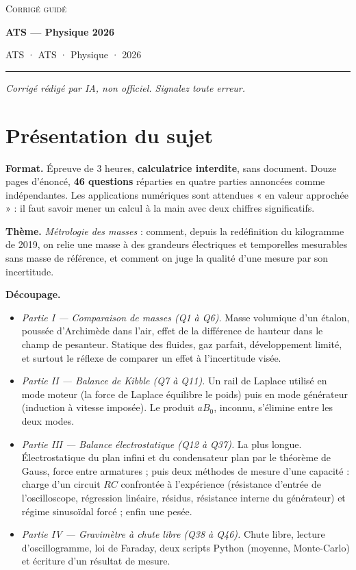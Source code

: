 \documentclass[11pt,a4paper]{article}
\providecommand{\tightlist}{\setlength{\itemsep}{0pt}\setlength{\parskip}{0pt}}
\begin{document}
\thispagestyle{plain}
\begin{center}
  {\small\scshape Corrigé guidé}\par\smallskip
  {\LARGE\bfseries ATS — Physique 2026\par}\medskip
  {\large ATS · ATS · Physique · 2026\par}
\end{center}
\vspace{2pt}\hrule\vspace{8pt}

\emph{Corrigé rédigé par IA, non officiel. Signalez toute erreur.}

\hypertarget{pruxe9sentation-du-sujet}{%
\section{Présentation du sujet}\label{pruxe9sentation-du-sujet}}

\textbf{Format.} Épreuve de 3 heures, \textbf{calculatrice interdite}, sans document. Douze pages d'énoncé, \textbf{46 questions} réparties en quatre parties annoncées comme indépendantes. Les applications numériques sont attendues « en valeur approchée » : il faut savoir mener un calcul à la main avec deux chiffres significatifs.

\textbf{Thème.} \emph{Métrologie des masses} : comment, depuis la redéfinition du kilogramme de 2019, on relie une masse à des grandeurs électriques et temporelles mesurables sans masse de référence, et comment on juge la qualité d'une mesure par son incertitude.

\textbf{Découpage.}

\begin{itemize}
\tightlist
\item
  \emph{Partie I --- Comparaison de masses (Q1 à Q6).} Masse volumique d'un étalon, poussée d'Archimède dans l'air, effet de la différence de hauteur dans le champ de pesanteur. Statique des fluides, gaz parfait, développement limité, et surtout le réflexe de comparer un effet à l'incertitude visée.
\item
  \emph{Partie II --- Balance de Kibble (Q7 à Q11).} Un rail de Laplace utilisé en mode moteur (la force de Laplace équilibre le poids) puis en mode générateur (induction à vitesse imposée). Le produit \(aB_0\), inconnu, s'élimine entre les deux modes.
\item
  \emph{Partie III --- Balance électrostatique (Q12 à Q37).} La plus longue. Électrostatique du plan infini et du condensateur plan par le théorème de Gauss, force entre armatures ; puis deux méthodes de mesure d'une capacité : charge d'un circuit \(RC\) confrontée à l'expérience (résistance d'entrée de l'oscilloscope, régression linéaire, résidus, résistance interne du générateur) et régime sinusoïdal forcé ; enfin une pesée.
\item
  \emph{Partie IV --- Gravimètre à chute libre (Q38 à Q46).} Chute libre, lecture d'oscillogramme, loi de Faraday, deux scripts Python (moyenne, Monte-Carlo) et écriture d'un résultat de mesure.
\end{itemize}
\end{document}
